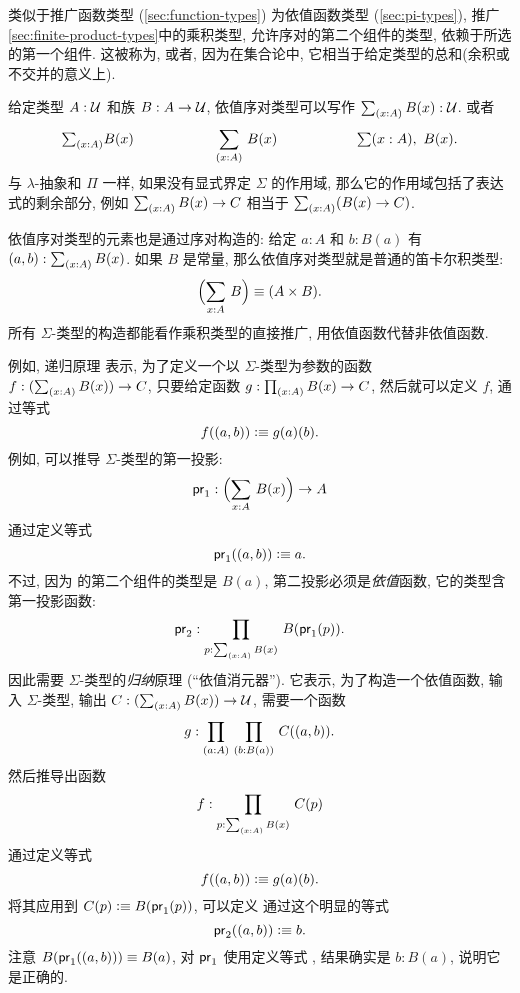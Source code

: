 %
%
%
%
%

类似于推广函数类型 (\cref{sec:function-types}) 为依值函数类型 (\cref{sec:pi-types}), 推广\cref{sec:finite-product-types}中的乘积类型, 允许序对的第二个组件的类型, 依赖于所选的第一个组件.
这被称为, 或者, 因为在集合论中, 它相当于给定类型的总和(余积或不交并的意义上).

给定类型 $A:\mathcal{U}$ 和族 $B : A \to \mathcal{U}$, 依值序对类型可以写作 $\sm{x:A} B(x) : \UU$.
或者
\[
    \tsm{x:A} B(x) \hspace{2cm} \dsm{x:A}B(x) \hspace{2cm} \lsm{x:A} B(x).
\]
与 $\lambda$-抽象和 $\Pi$ 一样, 如果没有显式界定 $\Sigma$ 的作用域, 那么它的作用域包括了表达式的剩余部分, 例如 $\sm{x:A} B(x) \to C$ 相当于 $\sm{x:A} (B(x) \to C)$.

%
%
依值序对类型的元素也是通过序对构造的: 给定 $a:A$ 和 $b:B(a)$ 有 $\tup{a}{b} : \sm{x:A} B(x)$.
如果 $B$ 是常量, 那么依值序对类型就是普通的笛卡尔积类型:
\[
    \Parens{\sm{x:A} B} \jdeq (A \times B).
\]
所有 $\Sigma$-类型的构造都能看作乘积类型的直接推广, 用依值函数代替非依值函数.

例如, 递归原理%
%
表示, 为了定义一个以 $\Sigma$-类型为参数的函数 $f : (\sm{x:A} B(x)) \to C$, 只要给定函数  $g : \prd{x:A} B(x) \to C$, 然后就可以定义 $f$, 通过等式
\[
    f((a,b)) \vcentcolon\equiv g(a)(b).
\]
%
例如, 可以推导 $\Sigma$-类型的第一投影:
%
\begin{equation*}
    \fst : \Parens{\sm{x : A}B(x)} \to A
\end{equation*}
通过定义等式
\begin{equation*}
    \mathsf{pr}_{1}((a,b)) \vcentcolon\equiv a.
\end{equation*}
不过, 因为
的第二个组件的类型是 $B(a)$, 第二投影必须是\emph{依值}函数, 它的类型含第一投影函数:
%
\[
    \snd : \prd{p:\sm{x : A}B(x)}B(\fst(p)).
\]
因此需要 $\Sigma$-类型的\emph{归纳}原理%
%
(``依值消元器'').
它表示, 为了构造一个依值函数, 输入 $\Sigma$-类型, 输出 $C : (\sm{x:A} B(x)) \to \UU$, 需要一个函数
\[
    g : \prd{a:A}{b:B(a)} C(\tup{a}{b}).
\]
然后推导出函数
\[
    f : \prd{p : \sm{x:A}B(x)} C(p)
\]
通过定义等式
\[
    f((a,b)) \vcentcolon\equiv g(a)(b).
\]
将其应用到 $C(p)\vcentcolon\equiv B(\mathsf{pr}_{1}(p))$, 可以定义
通过这个明显的等式
\[
    \mathsf{pr}_{2}((a,b)) \vcentcolon\equiv b.
\]
注意 $B (\mathsf{pr}_{1}((a,b))) \equiv B(a)$, 对 $\mathsf{pr}_{1}$ 使用定义等式 , 结果确实是 $b : B(a)$, 说明它是正确的.

